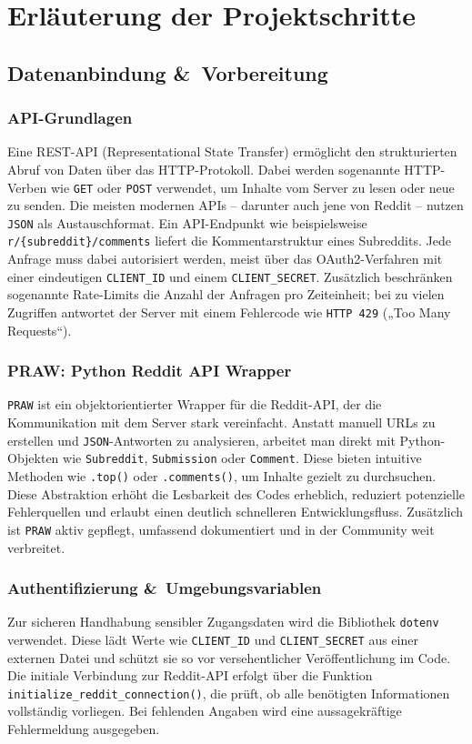 \section{Erläuterung der Projektschritte}

\subsection{Datenanbindung \&~Vorbereitung}

\subsubsection{API-Grundlagen}
Eine REST-API (Representational State Transfer) ermöglicht
den strukturierten Abruf von Daten über das HTTP-Protokoll.
Dabei werden sogenannte HTTP-Verben wie \texttt{GET} oder \texttt{POST} verwendet, um Inhalte vom Server zu lesen oder neue zu senden.
Die meisten modernen APIs – darunter auch jene von Reddit – nutzen \texttt{JSON} als Austauschformat.
Ein API-Endpunkt wie beispielsweise \texttt{r/\{subreddit\}/comments} liefert die Kommentarstruktur eines Subreddits.
Jede Anfrage muss dabei autorisiert werden, meist über das OAuth2-Verfahren mit einer eindeutigen \texttt{CLIENT\_ID} und einem \texttt{CLIENT\_SECRET}.
Zusätzlich beschränken sogenannte Rate-Limits die Anzahl der Anfragen pro Zeiteinheit; bei zu vielen Zugriffen antwortet der Server mit einem Fehlercode wie \texttt{HTTP 429} („Too Many Requests“).

\subsubsection{PRAW: Python Reddit API Wrapper}
\texttt{PRAW} ist ein objektorientierter Wrapper für die Reddit-API, der die Kommunikation mit dem Server stark vereinfacht.
Anstatt manuell URLs zu erstellen und \texttt{JSON}-Antworten zu analysieren, arbeitet man direkt mit Python-Objekten wie \texttt{Subreddit}, \texttt{Submission} oder \texttt{Comment}.
Diese bieten intuitive Methoden wie \texttt{.top()} oder \texttt{.comments()}, um Inhalte gezielt zu durchsuchen.
Diese Abstraktion erhöht die Lesbarkeit des Codes erheblich, reduziert potenzielle Fehlerquellen und erlaubt einen deutlich schnelleren Entwicklungsfluss.
Zusätzlich ist \texttt{PRAW} aktiv gepflegt, umfassend dokumentiert und in der Community weit verbreitet.

\subsubsection{Authentifizierung \&~Umgebungsvariablen}
Zur sicheren Handhabung sensibler Zugangsdaten wird die Bibliothek \texttt{dotenv} verwendet.
Diese lädt Werte wie \texttt{CLIENT\_ID} und \texttt{CLIENT\_SECRET} aus einer externen Datei und schützt sie so vor versehentlicher Veröffentlichung im Code.
Die initiale Verbindung zur Reddit-API erfolgt über die Funktion \texttt{initialize\_reddit\_connection()}, die prüft, ob alle benötigten Informationen vollständig vorliegen.
Bei fehlenden Angaben wird eine aussagekräftige Fehlermeldung ausgegeben.

